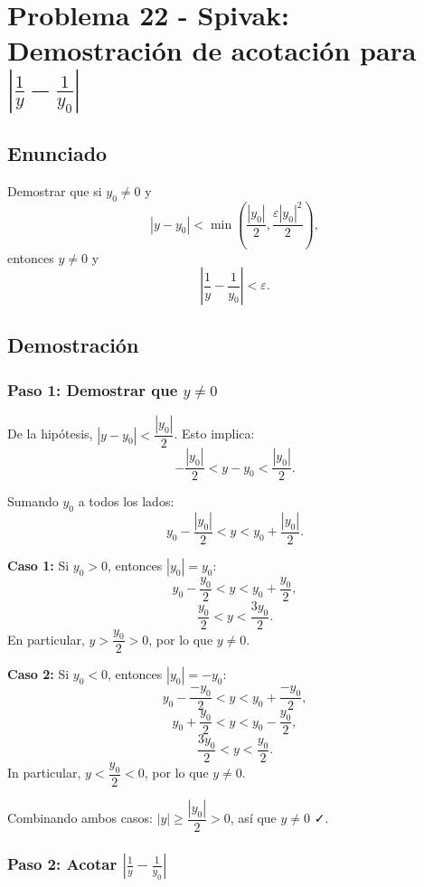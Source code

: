 
\section*{Problema 22 - Spivak: Demostración de acotación para $\left|\frac{1}{y} - \frac{1}{y_0}\right|$}

\subsection*{Enunciado}

Demostrar que si $y_0 \neq 0$ y 
\[
|y - y_0| < \min\left(\frac{|y_0|}{2}, \frac{\varepsilon|y_0|^2}{2}\right),
\]
entonces $y \neq 0$ y 
\[
\left|\frac{1}{y} - \frac{1}{y_0}\right| < \varepsilon.
\]

\subsection*{Demostración}

\subsubsection*{Paso 1: Demostrar que $y \neq 0$}

De la hipótesis, $|y - y_0| < \dfrac{|y_0|}{2}$. Esto implica:
\[
-\frac{|y_0|}{2} < y - y_0 < \frac{|y_0|}{2}.
\]

Sumando $y_0$ a todos los lados:
\[
y_0 - \frac{|y_0|}{2} < y < y_0 + \frac{|y_0|}{2}.
\]

\textbf{Caso 1:} Si $y_0 > 0$, entonces $|y_0| = y_0$:
\[
y_0 - \frac{y_0}{2} < y < y_0 + \frac{y_0}{2},
\]
\[
\frac{y_0}{2} < y < \frac{3y_0}{2}.
\]
En particular, $y > \dfrac{y_0}{2} > 0$, por lo que $y \neq 0$.

\textbf{Caso 2:} Si $y_0 < 0$, entonces $|y_0| = -y_0$:
\[
y_0 - \frac{-y_0}{2} < y < y_0 + \frac{-y_0}{2},
\]
\[
y_0 + \frac{y_0}{2} < y < y_0 - \frac{y_0}{2},
\]
\[
\frac{3y_0}{2} < y < \frac{y_0}{2}.
\]
In particular, $y < \dfrac{y_0}{2} < 0$, por lo que $y \neq 0$.

Combinando ambos casos: $|y| \geq \dfrac{|y_0|}{2} > 0$, así que $y \neq 0$ ✓.

\subsubsection*{Paso 2: Acotar $\left|\frac{1}{y} - \frac{1}{y_0}\right|$}

